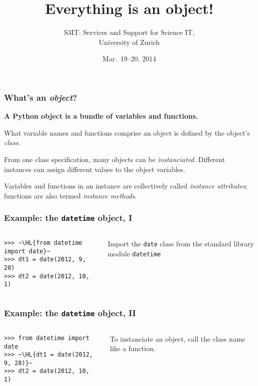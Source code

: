 \documentclass[english,serif,mathserif,xcolor=pdftex,dvipsnames,table]{beamer}
\title[Objects]{%
  Everything is an object!
}
\author[S3IT]{%
  S3IT: Services and Support for Science IT, \\
  University of Zurich
}
\date{Mar.~19--20, 2014}
\begin{document}
\maketitle


\begin{frame}
  \frametitle{What's an \emph{object}?}
  \textbf{A Python object is a bundle of variables and functions.}

  \+
  What variable names and functions comprise an object is defined
  by the object's \emph{class}.

  \+
  From one class specification, many objects can be
  \emph{instanciated}.  Different instances can assign different
  values to the object variables.

  \+
  Variables and functions in an instance are collectively called
  \emph{instance attributes}; functions are also termed \emph{instance
    methods}.
\end{frame}


\begin{frame}[fragile]
  \frametitle{Example: the \texttt{datetime} object, I}
  \begin{columns}[c]
    \begin{column}{0.5\textwidth}
\begin{lstlisting}
>>> ~\HL{from datetime import date}~
>>> dt1 = date(2012, 9, 28)
>>> dt2 = date(2012, 10, 1)
\end{lstlisting}
    \end{column}
    \begin{column}{0.45\textwidth}
      \raggedleft
      Import the \texttt{date} class from the standard
      library module \texttt{datetime}
    \end{column}
  \end{columns}
\end{frame}


\begin{frame}[fragile]
  \frametitle{Example: the \texttt{datetime} object, II}
  \begin{columns}[c]
    \begin{column}{0.5\textwidth}
\begin{lstlisting}
>>> from datetime import date
>>> ~\HL{dt1 = date(2012, 9, 28)}~
>>> dt2 = date(2012, 10, 1)
\end{lstlisting}
    \end{column}
    \begin{column}{0.5\textwidth}
      \raggedleft
      To instanciate an object, call the class name like a
      function.
    \end{column}
  \end{columns}
\end{frame}
\end{document}
